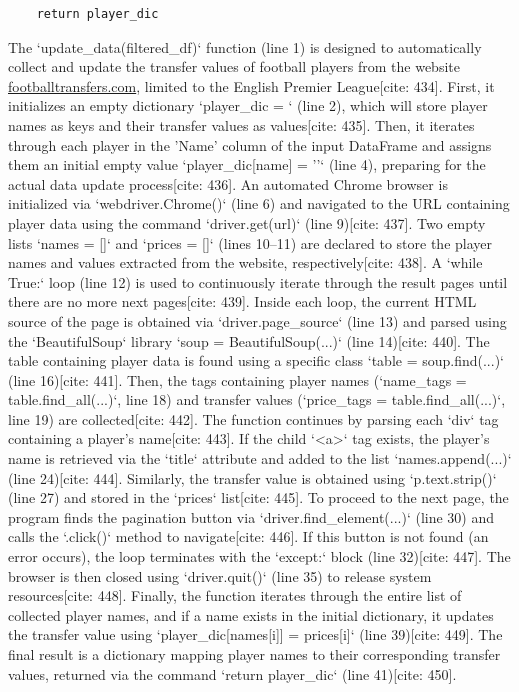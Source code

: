\documentclass[12pt]{report}
\begin{document}
{{{\begin{lstlisting}
    return player_dic
\end{lstlisting}
The `update\_data(filtered\_df)` function (line 1) is designed to automatically collect and update the transfer values of football players from the website \url{footballtransfers.com}, limited to the English Premier League[cite: 434]. First, it initializes an empty dictionary `player\_dic = {}` (line 2), which will store player names as keys and their transfer values as values[cite: 435]. Then, it iterates through each player in the 'Name' column of the input DataFrame and assigns them an initial empty value `player\_dic[name] = ''` (line 4), preparing for the actual data update process[cite: 436]. An automated Chrome browser is initialized via `webdriver.Chrome()` (line 6) and navigated to the URL containing player data using the command `driver.get(url)` (line 9)[cite: 437]. Two empty lists `names = []` and `prices = []` (lines 10–11) are declared to store the player names and values extracted from the website, respectively[cite: 438]. A `while True:` loop (line 12) is used to continuously iterate through the result pages until there are no more next pages[cite: 439]. Inside each loop, the current HTML source of the page is obtained via `driver.page\_source` (line 13) and parsed using the `BeautifulSoup` library `soup = BeautifulSoup(...)` (line 14)[cite: 440]. The table containing player data is found using a specific class `table = soup.find(...)` (line 16)[cite: 441]. Then, the tags containing player names (`name\_tags = table.find\_all(...)`, line 18) and transfer values (`price\_tags = table.find\_all(...)`, line 19) are collected[cite: 442]. The function continues by parsing each `div` tag containing a player's name[cite: 443]. If the child `<a>` tag exists, the player's name is retrieved via the `title` attribute and added to the list `names.append(...)` (line 24)[cite: 444]. Similarly, the transfer value is obtained using `p.text.strip()` (line 27) and stored in the `prices` list[cite: 445]. To proceed to the next page, the program finds the pagination button via `driver.find\_element(...)` (line 30) and calls the `.click()` method to navigate[cite: 446]. If this button is not found (an error occurs), the loop terminates with the `except:` block (line 32)[cite: 447]. The browser is then closed using `driver.quit()` (line 35) to release system resources[cite: 448]. Finally, the function iterates through the entire list of collected player names, and if a name exists in the initial dictionary, it updates the transfer value using `player\_dic[names[i]] = prices[i]` (line 39)[cite: 449]. The final result is a dictionary mapping player names to their corresponding transfer values, returned via the command `return player\_dic` (line 41)[cite: 450]. \\\\
}}}
\end{document}

